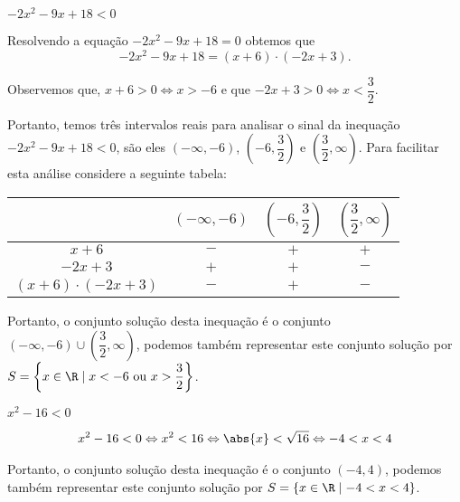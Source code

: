  \begin{exem}
 $-2x^2- 9x + 18 < 0$

  Resolvendo a equação $-2x^2- 9x + 18 = 0$ obtemos que
\begin{equation}
-2x^2- 9x + 18 = (x+6) \cdot (-2x + 3) . 
\end{equation}
 
 Observemos que, $x+6> 0 \Leftrightarrow x> -6$ e que $-2x + 3> 0 \Leftrightarrow x < \dfrac{3}{2}$. 
 
 Portanto, temos três intervalos reais para analisar o sinal da inequação $-2x^2- 9x + 18 < 0$, são eles $(-\infty, -6)$, $\left(-6, \dfrac{3}{2}\right)$ e $\left(\dfrac{3}{2}, \infty\right)$. Para facilitar esta análise considere a seguinte tabela:
 
 \begin{table}[H]
 \centering
 \begin{tabular}{|c|c|c|c|} \hline
 \rowcolor{cinza}
    & $(-\infty, -6)$ & $\left(-6, \dfrac{3}{2} \right)$ & $\left(\dfrac{3}{2}, \infty \right)$ \\ \hline
                $x+6$ & $-$             & $+$       & $+$ \\ \hline
            $-2x + 3$ & $+$             & $+$       & $-$ \\ \hline
$(x+6) \cdot (-2x + 3)$ & $-$             & $+$       & $-$ \\ \hline
 \end{tabular}
 \end{table}
 
 Portanto, o conjunto solução desta inequação é o conjunto $(-\infty, -6) \cup \left(\dfrac{3}{2}, \infty \right)$, podemos também representar este conjunto solução por $S= \left\{ x \in \R \mid x < -6 \text{ ou } x > \dfrac{3}{2} \right\}$.
 \end{exem} 
 
 \begin{exem}
 $x^2 - 16 < 0$
 
 \begin{eqnarray*}
 x^2 - 16 < 0 \Leftrightarrow x^2 < 16 \Leftrightarrow \abs{x} < \sqrt{16} \Leftrightarrow -4 < x < 4
 \end{eqnarray*}
 
Portanto, o conjunto solução desta inequação é o conjunto $(-4, 4)$, podemos também representar este conjunto solução por $S= \left\{ x \in \R \mid -4 < x < 4 \right\}$. 
 \end{exem}
 
